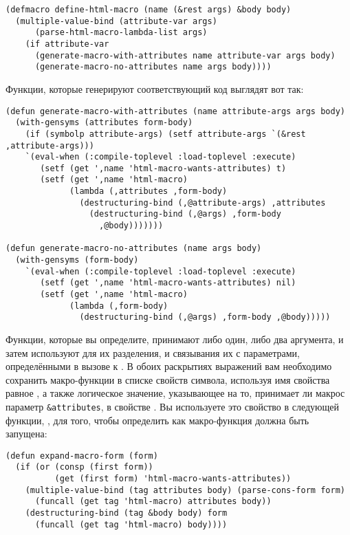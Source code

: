 \begin{lstlisting}
(defmacro define-html-macro (name (&rest args) &body body)
  (multiple-value-bind (attribute-var args)
      (parse-html-macro-lambda-list args)
    (if attribute-var
      (generate-macro-with-attributes name attribute-var args body)
      (generate-macro-no-attributes name args body))))
\end{lstlisting}

Функции, которые генерируют соответствующий код выглядят вот так:

\begin{lstlisting}
(defun generate-macro-with-attributes (name attribute-args args body)
  (with-gensyms (attributes form-body)
    (if (symbolp attribute-args) (setf attribute-args `(&rest ,attribute-args)))
    `(eval-when (:compile-toplevel :load-toplevel :execute)
       (setf (get ',name 'html-macro-wants-attributes) t)
       (setf (get ',name 'html-macro) 
             (lambda (,attributes ,form-body)
               (destructuring-bind (,@attribute-args) ,attributes
                 (destructuring-bind (,@args) ,form-body
                   ,@body)))))))

(defun generate-macro-no-attributes (name args body)
  (with-gensyms (form-body)
    `(eval-when (:compile-toplevel :load-toplevel :execute)
       (setf (get ',name 'html-macro-wants-attributes) nil)
       (setf (get ',name 'html-macro)
             (lambda (,form-body)
               (destructuring-bind (,@args) ,form-body ,@body)))))
\end{lstlisting}

Функции, которые вы определите, принимают либо один, либо два аргумента, и затем
используют  для их разделения, и связывания их с параметрами,
определёнными в вызове к .  В обоих раскрытиях выражений вам
необходимо сохранить макро-функции в списке свойств символа, используя имя свойства равное
, а также логическое значение, указывающее на то, принимает ли макрос
параметр \lstinline!&attributes!, в свойстве .  Вы
используете это свойство в следующей функции, , для того, чтобы
определить как макро-функция должна быть запущена:

\begin{lstlisting}
(defun expand-macro-form (form)
  (if (or (consp (first form))
          (get (first form) 'html-macro-wants-attributes))
    (multiple-value-bind (tag attributes body) (parse-cons-form form)
      (funcall (get tag 'html-macro) attributes body))
    (destructuring-bind (tag &body body) form
      (funcall (get tag 'html-macro) body))))
\end{lstlisting}

